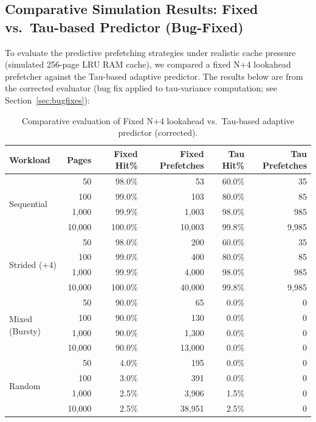 \documentclass[11pt,a4paper]{article}
\begin{document}
\subsection{Comparative Simulation Results: Fixed vs.\ Tau-based Predictor (Bug-Fixed)}
To evaluate the predictive prefetching strategies under realistic cache pressure (simulated 256-page LRU RAM cache), we compared a fixed N+4 lookahead prefetcher against the Tau-based adaptive predictor. The results below are from the corrected evaluator (bug fix applied to tau-variance computation; see Section~\ref{sec:bugfixes}):

\begin{table}[htbp]
\centering
\caption{Comparative evaluation of Fixed N+4 lookahead vs.\ Tau-based adaptive predictor (corrected).}
\label{tab:comparative}
\begin{tabular}{lrrrrr}
\toprule
\textbf{Workload} & \textbf{Pages} & \textbf{Fixed Hit\%} & \textbf{Fixed Prefetches} & \textbf{Tau Hit\%} & \textbf{Tau Prefetches} \\
\midrule
\multirow{4}{*}{Sequential}
 & 50 & 98.0\% & 53 & 60.0\% & 35 \\
 & 100 & 99.0\% & 103 & 80.0\% & 85 \\
 & 1{,}000 & 99.9\% & 1{,}003 & 98.0\% & 985 \\
 & 10{,}000 & 100.0\% & 10{,}003 & 99.8\% & 9{,}985 \\
\midrule
\multirow{4}{*}{Strided (+4)}
 & 50 & 98.0\% & 200 & 60.0\% & 35 \\
 & 100 & 99.0\% & 400 & 80.0\% & 85 \\
 & 1{,}000 & 99.9\% & 4{,}000 & 98.0\% & 985 \\
 & 10{,}000 & 100.0\% & 40{,}000 & 99.8\% & 9{,}985 \\
\midrule
\multirow{4}{*}{Mixed (Bursty)}
 & 50 & 90.0\% & 65 & 0.0\% & 0 \\
 & 100 & 90.0\% & 130 & 0.0\% & 0 \\
 & 1{,}000 & 90.0\% & 1{,}300 & 0.0\% & 0 \\
 & 10{,}000 & 90.0\% & 13{,}000 & 0.0\% & 0 \\
\midrule
\multirow{4}{*}{Random}
 & 50 & 4.0\% & 195 & 0.0\% & 0 \\
 & 100 & 3.0\% & 391 & 0.0\% & 0 \\
 & 1{,}000 & 2.5\% & 3{,}906 & 1.5\% & 0 \\
 & 10{,}000 & 2.5\% & 38{,}951 & 2.5\% & 0 \\
\bottomrule
\end{tabular}
\end{table}
\end{document}
